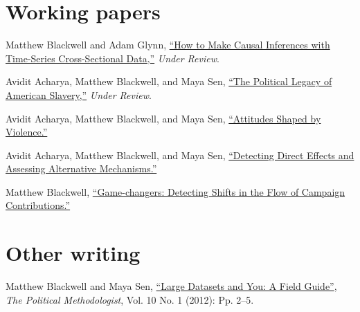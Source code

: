\documentclass[margin,line]{res}
\newenvironment{list1}{
  \begin{list}{\ding{113}}{%
      \setlength{\itemsep}{0in}
      \setlength{\parsep}{0in} \setlength{\parskip}{0in}
      \setlength{\topsep}{0in} \setlength{\partopsep}{0in} 
      \setlength{\leftmargin}{0.83 cm}}}{\end{list}}
\begin{document}
\begin{resume}
\section{\sc Working papers}

Matthew Blackwell and Adam Glynn, \href{http://www.mattblackwell.org/files/papers/causal-tscs.pdf}{``How to Make Causal Inferences with Time-Series
  Cross-Sectional Data,''} \emph{Under Review}.

Avidit Acharya, Matthew Blackwell, and Maya Sen, \href{http://www.mattblackwell.org/files/papers/slavery.pdf}{``The Political Legacy of American Slavery,''} \emph{Under Review}.

Avidit Acharya, Matthew Blackwell, and Maya Sen, \href{http://www.mattblackwell.org/files/papers/slaverytheory.pdf}{``Attitudes Shaped by Violence.''}

Avidit Acharya, Matthew Blackwell, and Maya Sen, \href{http://www.mattblackwell.org/files/papers/direct-effects.pdf}{``Detecting Direct Effects and Assessing Alternative
Mechanisms.''}

Matthew Blackwell, \href{http://www.mattblackwell.org/files/papers/gamechangers.pdf}{``Game-changers: Detecting Shifts in the Flow
  of Campaign Contributions.''}




\section{\sc Other writing}

Matthew Blackwell and Maya Sen, 
\href{http://polmeth.wustl.edu/methodologist/tpm_v20_n1.pdf}{``Large
  Datasets and You: A Field Guide''}, \emph{The Political
  Methodologist}, Vol. 10 No. 1 (2012): Pp. 2--5.


\end{resume}
\end{document}
